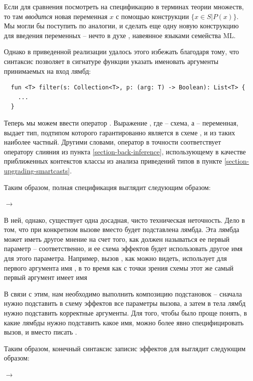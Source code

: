 Если для сравнения посмотреть на спецификацию  в терминах теории множеств, то там \emph{вводится} новая переменная $x$ с помощью конструкции $\{ x \in S | P(x) \}$. Мы могли бы поступить по аналогии, и сделать еще одну новую конструкцию для введения переменных -- нечто в духе , навеянное языками семейства ML.

Однако в приведенной реализации удалось этого избежать благодаря тому, что синтаксис  позволяет в сигнатуре функции указать именовать аргументы принимаемых на вход лямбд:

\begin{verbatim}
  fun <T> filter(s: Collection<T>, p: (arg: T) -> Boolean): List<T> {
    ...
  }
\end{verbatim}

Теперь мы можем ввести оператор . Выражение , где  -- схема, а  -- переменная, выдает тип, подтипом которого гарантированно является  в схеме , и из таких наиболее частный. Другими словами, оператор  в точности соответствует оператору слияния из пункта \ref{section-back-inference}, использующему в качестве приближенных контекстов классы  из анализа приведений типов в пункте \ref{section-upgrading-smartcasts}.

Таким образом, полная спецификация  выглядит следующим образом:

{
   $\rightarrow$ 
}{}

В ней, однако, существует одна досадная, чисто техническая неточность. Дело в том, что при конкретном вызове  вместо  будет подставлена лямбда. Эта лямбда может иметь другое мнение на счет того, как должен называться ее первый параметр -- соответственно, и ее схема эффектов будет использовать другое имя для этого параметра. Например, вызов , как можно видеть, использует для первого аргумента имя , в то время как с точки зрения схемы этот же самый первый аргумент имеет имя 

В связи с этим, нам необходимо выполнить композицию подстановок -- сначала нужно подставить в схему эффектов  все параметры вызова, а затем в тела лямбд нужно подставить корректные аргументы. Для того, чтобы было проще понять, в какие лямбды нужно подставить какое имя, можно более явно специфицировать вызов, и вместо  писать .

Таким образом, конечный синтаксис записис эффектов для  выглядит следующим образом:

{
   $\rightarrow$  
}
{}

